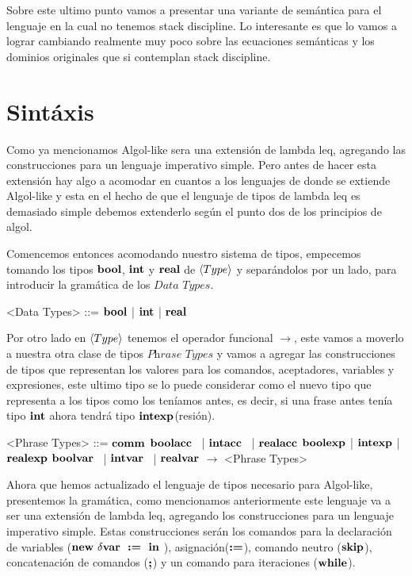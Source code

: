 Sobre este ultimo punto vamos a presentar una variante de sem\'antica para el lenguaje
en la cual no tenemos stack discipline. Lo interesante es que lo vamos a lograr cambiando
realmente muy poco sobre las ecuaciones sem\'anticas y los dominios originales que
si contemplan stack discipline.

\section{Sint\'axis}

Como ya mencionamos Algol-like sera una extensi\'on de lambda leq, agregando las
construcciones para un lenguaje imperativo simple. Pero antes de hacer esta extensi\'on
hay algo a acomodar en cuantos a los lenguajes de donde se extiende Algol-like y
esta en el hecho de que el lenguaje de tipos de lambda leq es demasiado simple debemos
extenderlo seg\'un el punto dos de los principios de algol.

Comencemos entonces acomodando nuestro sistema de tipos, empecemos tomando los tipos
$\textbf{bool}$, $\textbf{int}$ y $\textbf{real}$ de $\langle Type \rangle$ y separándolos por un lado, para
introducir la gram\'atica de los  $\textit{Data Types}$.

\setlength{\grammarindent}{6em}
\begin{grammar}

<Data Types> ::= $\textbf{bool}$ | $\textbf{int}$ | $\textbf{real}$

\end{grammar}

Por otro lado en $\langle Type \rangle$ tenemos el operador funcional $\rightarrow$, este vamos 
a moverlo a nuestra otra clase de tipos $\textit{Phrase Types}$ y vamos a agregar las
construcciones de tipos que representan los valores para los comandos, aceptadores, variables y 
expresiones, este ultimo tipo se lo puede considerar como el nuevo tipo que 
representa a los tipos como los ten\'iamos antes, es decir, si una frase antes
ten\'ia tipo $\textbf{int}$ ahora tendr\'a tipo $\textbf{int}\textbf{exp}$(resi\'on).

\setlength{\grammarindent}{8em}
\begin{grammar}

<Phrase Types> ::= $\textbf{comm}$
\alt $\textbf{boolacc}$ \ | $\textbf{intacc}$ \ | $\textbf{realacc}$
\alt $\textbf{boolexp}$ | $\textbf{intexp}$ | $\textbf{realexp}$
\alt $\textbf{boolvar}$ \ | $\textbf{intvar}$ \ | $\textbf{realvar}$
 $\rightarrow$ <Phrase Types>

\end{grammar}

Ahora que hemos actualizado el lenguaje de tipos necesario para Algol-like, presentemos
la gram\'atica, como mencionamos anteriormente este lenguaje va a ser una extensi\'on de lambda leq, agregando los construcciones para un lenguaje imperativo simple. Estas construcciones 
ser\'an los comandos para la declaraci\'on de variables ($\textbf{new} \ \delta \textbf{var} \ \ \textbf{:=} \  \ \textbf{in} \ $), 
asignaci\'on($\textbf{:=}$), comando neutro ($\textbf{skip}$), concatenaci\'on de comandos ($\textbf{;}$)
y un comando para iteraciones ($\textbf{while}$).

